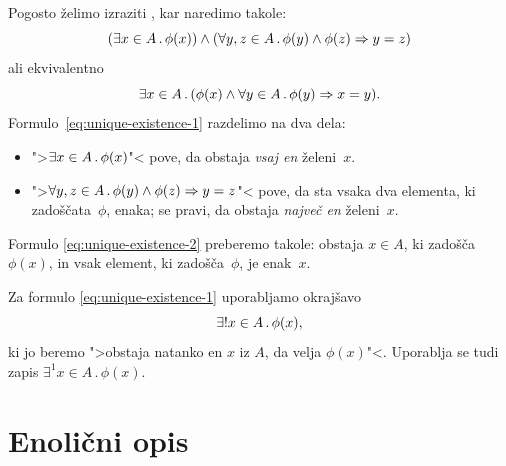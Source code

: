 Pogosto želimo izraziti , kar naredimo takole:
%
\begin{equation}
  \label{eq:unique-existence-1}
  (\exists x \in A \,.\, \phi(x)) \land (\forall y, z \in A \,.\, \phi(y) \land \phi(z) \Rightarrow y = z)
\end{equation}
%
ali ekvivalentno
%
\begin{equation}
  \label{eq:unique-existence-2}
  \exists x \in A \,.\, (\phi(x) \land \forall y \in A \,.\, \phi(y) \Rightarrow x = y).
\end{equation}
%
Formulo~\eqref{eq:unique-existence-1} razdelimo na dva dela:
%
\begin{itemize}
\item ">$\exists x \in A \,.\, \phi(x)$"< pove, da obstaja \emph{vsaj en} želeni~$x$.
\item ">$\forall y, z \in A \,.\, \phi(y) \land \phi(z) \Rightarrow y = z$"< pove, da sta vsaka dva elementa, ki zadoščata~$\phi$, enaka; se pravi, da obstaja \emph{največ en} želeni~$x$.
\end{itemize}
%
Formulo \eqref{eq:unique-existence-2} preberemo takole: obstaja $x \in A$, ki zadošča $\phi(x)$, in vsak element, ki zadošča~$\phi$, je enak~$x$.

Za formulo \eqref{eq:unique-existence-1} uporabljamo okrajšavo
%
\begin{equation*}
  \exists! x \in A \,.\, \phi(x),
\end{equation*}
%
ki jo beremo ">obstaja natanko en $x$ iz $A$, da velja $\phi(x)$"<.
%
Uporablja se tudi zapis $\exists^1 x \in A \,.\, \phi(x)$.

\section{Enolični opis}

